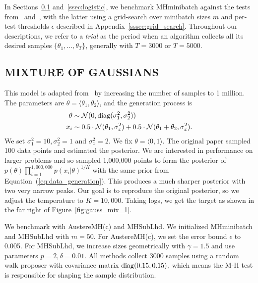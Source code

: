 \documentclass[letterpaper]{article}
\begin{document}
In Sections~\ref{ssec:gaussians} and~\ref{ssec:logistic}, we benchmark {\sc
MHminibatch} against the tests from~\citep{icml2014c1_bardenet14}
and~\citep{cutting_mh_2014}, with the latter using a grid-search over minibatch
sizes $m$ and per-test thresholds $\epsilon$ described in
Appendix~\ref{sssec:grid_search}. Throughout our descriptions, we refer to a
\emph{trial} as the period when an algorithm collects all its desired samples
$\{\theta_1,\ldots,\theta_T\}$, generally with $T=3000$ or $T=5000$.

\subsection{MIXTURE OF GAUSSIANS}\label{ssec:gaussians}

This model is adapted from~\citep{langevin_2011} by increasing the number of
samples to 1 million.  The parameters are $\theta = \langle \theta_1,\theta_2
\rangle$, and the generation process is
\begin{equation}\label{eq:data_generation}
\begin{split}
    \theta &\sim \mathcal{N}(0, {\rm diag}(\sigma_1^2,\sigma_2^2)) \\
    x_i & \sim 0.5 \cdot \mathcal{N}(\theta_1, \sigma_x^2) + 0.5 \cdot \mathcal{N}(\theta_1+\theta_2, \sigma_x^2).
\end{split}
\end{equation}
We set $\sigma_1^2 = 10, \sigma_2^2 = 1$ and $\sigma_x^2=2$.  We fix $\theta =
\langle 0,1 \rangle$. The original paper sampled 100 data points and estimated
the posterior. We are interested in performance on larger problems and so
sampled 1,000,000 points to form the posterior of
$p(\theta)\prod_{i=1}^{1,000,000}p(x_i | \theta)^{1/K}$ with the same prior from
Equation~(\ref{eq:data_generation}). This produces a much sharper posterior with
two very narrow peaks.  Our goal is to reproduce the original posterior, so we
adjust the temperature to $K=10,000$.  Taking logs, we get the target as shown
in the far right of Figure~\ref{fig:gauss_mix_1}.

We benchmark with {\sc AustereMH(c)} and {\sc MHSubLhd}. We initialized {\sc
MHminibatch} and {\sc MHSubLhd} with $m=50$. For {\sc AustereMH(c)}, we set
the error bound $\epsilon$ to 0.005.  For {\sc MHSubLhd}, we increase
sizes geometrically with $\gamma = 1.5$ and use parameters $p = 2, \delta =
0.01$.  All methods collect 3000 samples using a random walk proposer with
covariance matrix ${\rm diag}(0.15, 0.15)$, which means the M-H test is
responsible for shaping the sample distribution.
\end{document}
